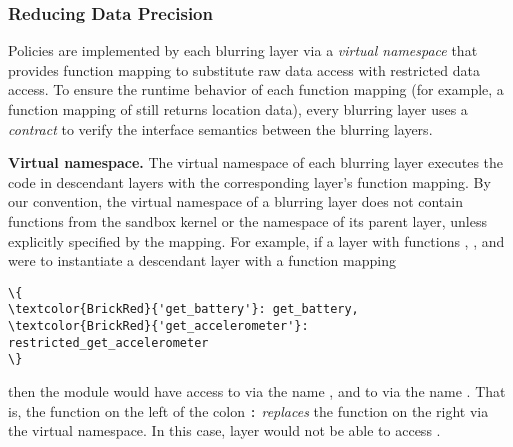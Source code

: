 \subsubsection{Reducing Data Precision}\label{sec-layer}



Policies are implemented by each blurring layer via a \textit{virtual 
namespace} that provides function mapping to substitute raw 
data access with restricted data access. 
To ensure the runtime behavior of each function mapping (for example, 
a function mapping of  still returns location data), 
every blurring layer uses a \textit{contract} to verify the interface 
semantics between the blurring layers.

\textbf{Virtual namespace.}
The virtual namespace of each blurring layer executes the code in descendant 
layers with the corresponding layer's function mapping. By our convention, 
the virtual namespace of a blurring layer does not contain functions from the 
sandbox kernel or the namespace of its parent layer, unless explicitly 
specified by the mapping. 
For example, if a layer  with 
functions , , and 
 were to instantiate a descendant 
layer  with a function mapping 

\begin{Verbatim}
\{
\textcolor{BrickRed}{'get_battery'}: get_battery, 
\textcolor{BrickRed}{'get_accelerometer'}: restricted_get_accelerometer
\}
\end{Verbatim}
then the module  would have access
to  via the name , and to
 via the name 
. That is, the function on the left of the colon \texttt{:}
\textit{replaces} the function on the right via the virtual namespace. 
In this case, layer  would not be able to access 
.

